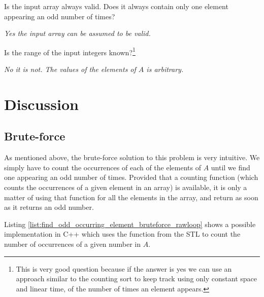 \begin{QandA}
	\item \begin{questionitem} \begin{question} Is the input array always valid. Does it always contain only one element appearing an odd number of times?  \end{question} 	 
    \begin{answered}
		\textit{Yes the input array can be assumed to be valid.}
	\end{answered} \end{questionitem}
	\item \begin{questionitem} \begin{question} Is the range of the input integers known?\footnote{This is very good question because if the answer is yes we can use an approach similar to the counting sort to keep track using only constant space and linear time, of the number of times an element appears.}  \end{question} 	 
    \begin{answered}
		\textit{No it is not. The values of the elements of $A$ is arbitrary.}
	\end{answered} \end{questionitem}
	
\end{QandA}

\section{Discussion}

\subsection{Brute-force}
\label{find_odd_occurring_element:sec:bruteforce}

As mentioned above, the brute-force solution to this problem is very intuitive.  We simply have to count the occurrences of each of the elements of $A$ until we find one appearing an odd number of times.  
Provided that a counting function (which counts the occurrences of a given element in an array) is available, it is only a matter of using that function for all the elements in the array, and return as soon as it returns an odd number. 

Listing \ref{list:find_odd_occurring_element_bruteforce_rawloop} shows a possible implementation in C++ which uses the  function from the STL to count the number of occurrences of a given number in $A$.


